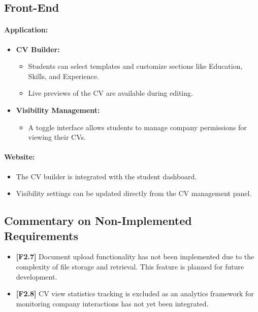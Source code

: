 \subsection*{Front-End}
\paragraph{Application:}
\begin{itemize}
    \item \textbf{CV Builder:}
    \begin{itemize}
        \item Students can select templates and customize sections like Education, Skills, and Experience.
        \item Live previews of the CV are available during editing.
    \end{itemize}
    \item \textbf{Visibility Management:}
    \begin{itemize}
        \item A toggle interface allows students to manage company permissions for viewing their CVs.
    \end{itemize}
\end{itemize}

\paragraph{Website:}
\begin{itemize}
    \item The CV builder is integrated with the student dashboard.
    \item Visibility settings can be updated directly from the CV management panel.
\end{itemize}

\subsection*{Commentary on Non-Implemented Requirements}
\begin{itemize}
    \item \textbf{[F2.7]} Document upload functionality has not been implemented due to the complexity of file storage and retrieval. This feature is planned for future development.
    \item \textbf{[F2.8]} CV view statistics tracking is excluded as an analytics framework for monitoring company interactions has not yet been integrated.
\end{itemize}

